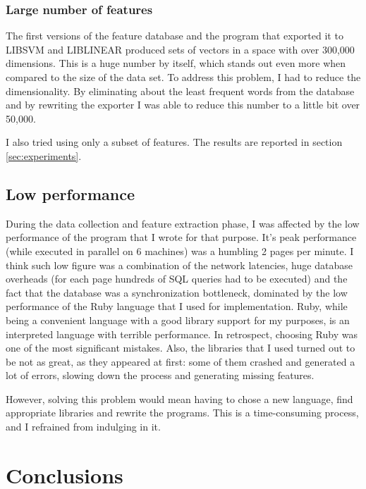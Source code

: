 \documentclass{article}
\begin{document}
\subsubsection{Large number of features}
\label{sec:large-numb-feat}

The first versions of the feature database and the program that
exported it to LIBSVM and LIBLINEAR produced sets of vectors in a
space with over 300,000 dimensions. This is a huge number by itself,
which stands out even more when compared to the size of the data
set. To address this problem, I had to reduce the dimensionality. By
eliminating about the least frequent words from the
database and by rewriting the exporter I was able to reduce this
number to a little bit over 50,000.

I also tried using only a subset of features. The results are reported
in section \ref{sec:experiments}.

\subsection{Low performance}
\label{sec:low-performance}

During the data collection and feature extraction phase, I was
affected by the low performance of the program that I wrote for that
purpose. It's peak performance (while executed in parallel on 6
machines) was a humbling 2 pages per minute. I think such low figure
was a combination of the network latencies, huge database overheads
(for each page hundreds of SQL queries had to be executed) and the
fact that the database was a synchronization bottleneck, dominated by
the low performance of the Ruby language that I used for
implementation. Ruby, while being a convenient language with a good
library support for my purposes, is an interpreted language with
terrible performance. In retrospect, choosing Ruby was one of the most
significant mistakes. Also, the libraries that I used turned out to be
not as great, as they appeared at first: some of them crashed and
generated a lot of errors, slowing down the process and generating
missing features.

However, solving this problem would mean having to chose a new
language, find appropriate libraries and rewrite the programs. This is
a time-consuming process, and I refrained from indulging in it.

\section{Conclusions}
\label{sec:conclusions}
\end{document}

